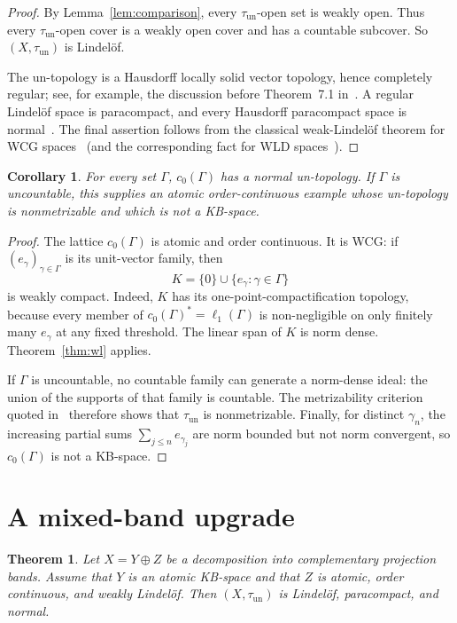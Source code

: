 \documentclass[11pt]{amsart}
\newtheorem{theorem}{Theorem}
\newtheorem{corollary}{Corollary}
\newcommand{\tun}{\tau_{\mathrm{un}}}
\begin{document}
\begin{proof}
By Lemma~\ref{lem:comparison}, every $\tun$-open set is weakly open.  Thus
every $\tun$-open cover is a weakly open cover and has a countable subcover.
So $(X,\tun)$ is Lindel\"of.

The un-topology is a Hausdorff locally solid vector topology, hence completely
regular; see, for example, the discussion before Theorem~7.1 in~\cite{KV}.
A regular Lindel\"of space is paracompact, and every Hausdorff paracompact
space is normal~\cite{Dugundji}.  The final assertion follows from the
classical weak-Lindel\"of theorem for WCG spaces~\cite{Orihuela} (and the
corresponding fact for WLD spaces~\cite{AM}).
\end{proof}

\begin{corollary}\label{cor:c0}
For every set $\Gamma$, $c_0(\Gamma)$ has a normal un-topology.  If $\Gamma$
is uncountable, this supplies an atomic order-continuous example whose
un-topology is nonmetrizable and which is not a KB-space.
\end{corollary}

\begin{proof}
The lattice $c_0(\Gamma)$ is atomic and order continuous.  It is WCG: if
$(e_\gamma)_{\gamma\in\Gamma}$ is its unit-vector family, then
\[
 K=\{0\}\cup\{e_\gamma:\gamma\in\Gamma\}
\]
is weakly compact.  Indeed, $K$ has its one-point-compactification topology,
because every member of $c_0(\Gamma)^*=\ell_1(\Gamma)$ is non-negligible on
only finitely many $e_\gamma$ at any fixed threshold.  The linear span of $K$
is norm dense.  Theorem~\ref{thm:wl} applies.

If $\Gamma$ is uncountable, no countable family can generate a norm-dense
ideal: the union of the supports of that family is countable.  The
metrizability criterion quoted in~\cite[Section~7]{KV} therefore shows that
$\tun$ is nonmetrizable.  Finally, for distinct $\gamma_n$, the increasing
partial sums $\sum_{j\le n}e_{\gamma_j}$ are norm bounded but not norm
convergent, so $c_0(\Gamma)$ is not a KB-space.
\end{proof}

\section*{A mixed-band upgrade}

\begin{theorem}\label{thm:mixed}
Let $X=Y\oplus Z$ be a decomposition into complementary projection bands.
Assume that $Y$ is an atomic KB-space and that $Z$ is atomic, order
continuous, and weakly Lindel\"of.  Then $(X,\tun)$ is Lindel\"of,
paracompact, and normal.
\end{theorem}
\end{document}
